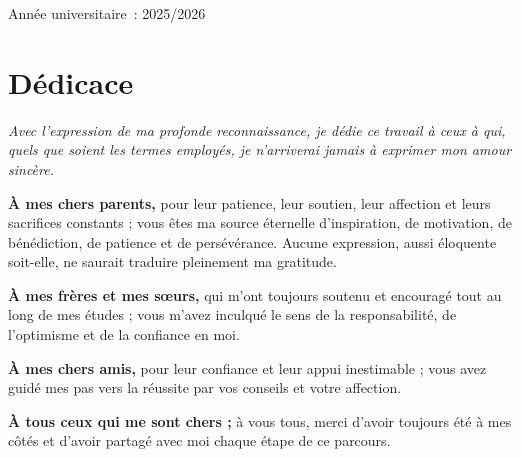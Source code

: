 \documentclass[11pt,a4paper,twoside]{report}
\begin{document}
\begin{titlepage}
    \vspace{4cm}

    {\large Année universitaire~: 2025/2026}

\end{titlepage}

\chapter*{Dédicace}

\vspace{1cm}

\begin{center}
\textit{Avec l'expression de ma profonde reconnaissance, je dédie ce travail à ceux à qui, quels que soient les termes employés, je n'arriverai jamais à exprimer mon amour sincère.}
\end{center}

\vspace{0.5cm}

\textbf{À mes chers parents,} pour leur patience, leur soutien, leur affection et leurs sacrifices constants ; vous êtes ma source éternelle d'inspiration, de motivation, de bénédiction, de patience et de persévérance. Aucune expression, aussi éloquente soit-elle, ne saurait traduire pleinement ma gratitude.

\vspace{0.4cm}

\textbf{À mes frères et mes sœurs,} qui m'ont toujours soutenu et encouragé tout au long de mes études ; vous m'avez inculqué le sens de la responsabilité, de l'optimisme et de la confiance en moi.

\vspace{0.4cm}

\textbf{À mes chers amis,} pour leur confiance et leur appui inestimable ; vous avez guidé mes pas vers la réussite par vos conseils et votre affection.

\vspace{0.4cm}

\textbf{À tous ceux qui me sont chers ;} à vous tous, merci d'avoir toujours été à mes côtés et d'avoir partagé avec moi chaque étape de ce parcours.

\newpage

\end{document}
